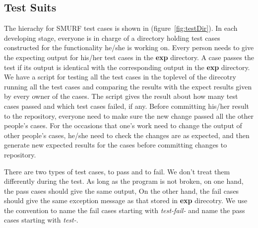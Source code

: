 \subsection{Test Suits}

The hierachy for SMURF test cases is shown in (figure~\ref{fig:testDir}). 
In each developing stage, everyone is in charge of a directory holding test cases constructed for the functionality he/she is working on. 
Every person needs to give the expecting output for his/her test cases in the {\bf exp} directory.
A case passes the test if its output is identical with the corresponding output in the {\bf exp} directory.
We have a script for testing all the test cases in the toplevel of the direcotry running all the test cases and comparing the results with the expect results given by every owner of the cases. 
The script gives the result about how many test cases passed and which test cases failed, if any. 
Before committing his/her result to the repository, everyone need to make sure the new change passed all the other people's cases. 
For the occasions that one's work need to change the output of other people's cases, 
he/she need to check the changes are as expected, 
and then generate new expected results for the cases before committing changes to repository.

There are two types of test cases, to pass and to fail. We don't treat them differently during the test.
As long as the program is not broken, on one hand, the pass cases should give the same output, 
On the other hand, the fail cases should give the same exception message as that stored in {\bf exp} direcotry.
We use the convention to name the fail cases starting with {\it test-fail-} and name the pass cases starting with {\it test-}.

